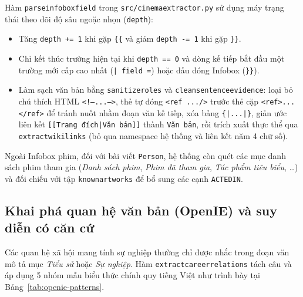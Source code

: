 \documentclass[12pt,a4paper]{article}
\renewcommand{\_}{\oldunderscore\hspace{0pt}}
\begin{document}
Hàm \texttt{parse\_infobox\_field} trong \texttt{src/\allowbreak cinema\_extractor.py} sử dụng máy trạng thái theo dõi độ sâu ngoặc nhọn (\texttt{depth}):
\begin{itemize}
  \item Tăng \texttt{depth += 1} khi gặp \texttt{\{\{} và giảm \texttt{depth -= 1} khi gặp \texttt{\}\}}.
  \item Chỉ kết thúc trường hiện tại khi \texttt{depth == 0} và dòng kế tiếp bắt đầu một trường mới cấp cao nhất (\texttt{| field =}) hoặc dấu đóng Infobox (\texttt{\}\}}).
  \item Làm sạch văn bản bằng \texttt{sanitize\_roles} và \texttt{clean\_sentence\_evidence}: loại bỏ chú thích HTML \texttt{<!--\allowbreak ...\allowbreak -->}, thẻ tự đóng \texttt{<ref\allowbreak{} .../>} trước thẻ cặp \texttt{<ref>\allowbreak ...\allowbreak </ref>} để tránh nuốt nhầm đoạn văn kế tiếp, xóa bảng \texttt{\{|...|\}}, giản ước liên kết \texttt{[[Trang đích|\allowbreak Văn bản]]} thành \texttt{Văn bản}, rồi trích xuất thực thể qua \texttt{extract\_wiki\_links} (bỏ qua namespace hệ thống và liên kết năm 4 chữ số).
\end{itemize}

Ngoài Infobox phim, đối với bài viết \texttt{Person}, hệ thống còn quét các mục danh sách phim tham gia (\textit{Danh sách phim}, \textit{Phim đã tham gia}, \textit{Tác phẩm tiêu biểu}, \dots) và đối chiếu với tập \texttt{known\_artworks} để bổ sung các cạnh \texttt{ACTED\_IN}.

\subsection{Khai phá quan hệ văn bản (OpenIE) và suy diễn có căn cứ}

Các quan hệ xã hội mang tính sự nghiệp thường chỉ được nhắc trong đoạn văn mô tả mục \textit{Tiểu sử} hoặc \textit{Sự nghiệp}. Hàm \texttt{extract\_career\_relations} tách câu và áp dụng 5 nhóm mẫu biểu thức chính quy tiếng Việt như trình bày tại Bảng~\ref{tab:openie-patterns}.
\end{document}
